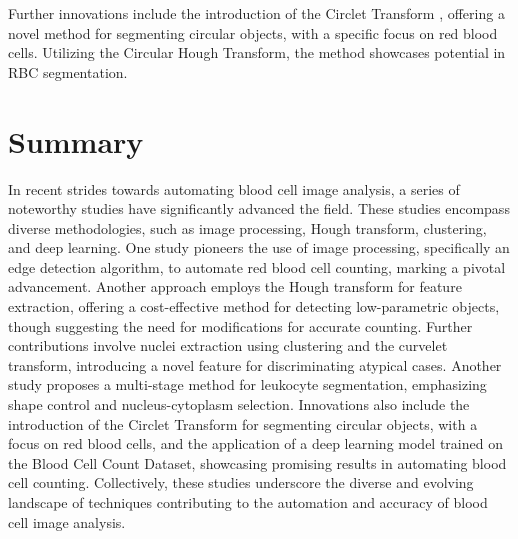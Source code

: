Further innovations include the introduction of the Circlet Transform \cite{soltanzadeh2012extraction}, offering a novel method for segmenting circular objects, with a specific focus on red blood cells. Utilizing the Circular Hough Transform, the method showcases potential in RBC segmentation.

\section{Summary} 
In recent strides towards automating blood cell image analysis, a series of noteworthy studies have significantly advanced the field. These studies encompass diverse methodologies, such as image processing, Hough transform, clustering, and deep learning. One study pioneers the use of image processing, specifically an edge detection algorithm, to automate red blood cell counting, marking a pivotal advancement. Another approach employs the Hough transform for feature extraction, offering a cost-effective method for detecting low-parametric objects, though suggesting the need for modifications for accurate counting. Further contributions involve nuclei extraction using clustering and the curvelet transform, introducing a novel feature for discriminating atypical cases. Another study proposes a multi-stage method for leukocyte segmentation, emphasizing shape control and nucleus-cytoplasm selection. Innovations also include the introduction of the Circlet Transform for segmenting circular objects, with a focus on red blood cells, and the application of a deep learning model trained on the Blood Cell Count Dataset, showcasing promising results in automating blood cell counting. Collectively, these studies underscore the diverse and evolving landscape of techniques contributing to the automation and accuracy of blood cell image analysis.